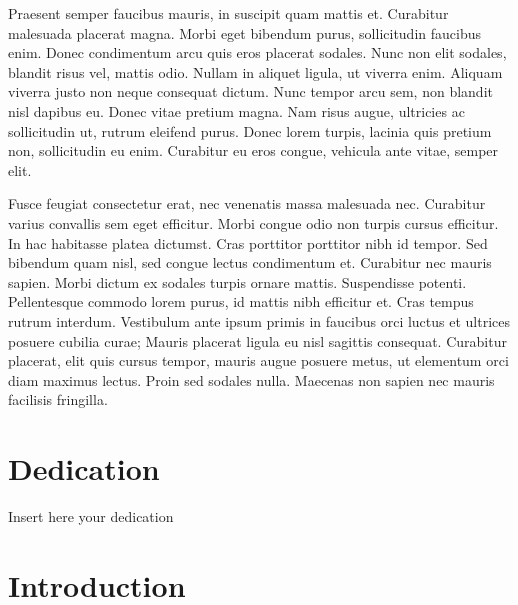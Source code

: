 \documentclass[
]{article}
\begin{document}
Praesent semper faucibus mauris, in suscipit quam mattis et. Curabitur malesuada placerat magna. Morbi eget bibendum purus, sollicitudin faucibus enim. Donec condimentum arcu quis eros placerat sodales. Nunc non elit sodales, blandit risus vel, mattis odio. Nullam in aliquet ligula, ut viverra enim. Aliquam viverra justo non neque consequat dictum. Nunc tempor arcu sem, non blandit nisl dapibus eu. Donec vitae pretium magna. Nam risus augue, ultricies ac sollicitudin ut, rutrum eleifend purus. Donec lorem turpis, lacinia quis pretium non, sollicitudin eu enim. Curabitur eu eros congue, vehicula ante vitae, semper elit.

Fusce feugiat consectetur erat, nec venenatis massa malesuada nec. Curabitur varius convallis sem eget efficitur. Morbi congue odio non turpis cursus efficitur. In hac habitasse platea dictumst. Cras porttitor porttitor nibh id tempor. Sed bibendum quam nisl, sed congue lectus condimentum et. Curabitur nec mauris sapien. Morbi dictum ex sodales turpis ornare mattis. Suspendisse potenti. Pellentesque commodo lorem purus, id mattis nibh efficitur et. Cras tempus rutrum interdum. Vestibulum ante ipsum primis in faucibus orci luctus et ultrices posuere cubilia curae; Mauris placerat ligula eu nisl sagittis consequat. Curabitur placerat, elit quis cursus tempor, mauris augue posuere metus, ut elementum orci diam maximus lectus. Proin sed sodales nulla. Maecenas non sapien nec mauris facilisis fringilla.

\clearpage

\section*{Dedication}

\begin{center}
    \vspace*{\fill}
    Insert here your dedication
    \vspace*{\fill}
\end{center}

\clearpage

\hypertarget{introduction}{%
\section{Introduction}\label{introduction}}


\renewcommand{\thefigure}{1.\arabic{figure}}
\setcounter{figure}{0}
\renewcommand{\thetable}{1.\arabic{table}}
\setcounter{table}{0}
\renewcommand{\theequation}{1.\arabic{equation}}
\setcounter{equation}{0}
\end{document}
